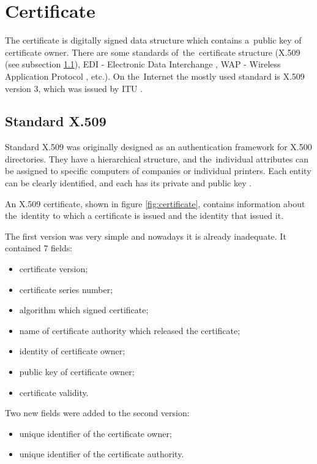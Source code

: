 \documentclass[
  12pt, 
  digital, %
  notable,   %
  nolof,     %
  nolot,     %
]{fithesis3}
\begin{document}
\section{Certificate}
The certificate is digitally signed data structure which contains a~public key of certificate 
owner. There are some standards of~the~certificate structure (X.509 (see subsection \ref{x509}), EDI - Electronic Data Interchange \cite{edi}, WAP - Wireless Application Protocol \cite{sharma2003wireless}, etc.). On the~Internet the mostly used standard is X.509 version 3, 
which was issued by ITU \cite{dostalek2016velky}. %

\subsection{Standard X.509}\label{x509}
Standard X.509 was originally designed as an authentication framework for X.500 directories. They 
have a hierarchical structure, and the~individual attributes can be assigned to specific computers 
of companies or individual printers. Each entity can be clearly identified, and each has its 
private and public key \cite{schmeh2006cryptography}. 

An X.509 certificate, shown in figure \ref{fig:certificate}, contains information about the~identity to which a certificate is issued and the identity that issued it. 

The first version was very simple and nowadays it is already inadequate. It contained 7 fields:
\begin{itemize}[leftmargin=2em,rightmargin=1em,itemsep=0.75\parskip,parsep=0em,topsep=0em,partopsep=0em]
\item certificate version;
\item certificate series number;
\item algorithm which signed certificate;
\item name of certificate authority which released the certificate;
\item identity of certificate owner;
\item public key of certificate owner;
\item certificate validity.
\end{itemize}
\vskip 0.1in

Two new fields were added to the second version:
\begin{itemize}[leftmargin=2em,rightmargin=1em,itemsep=0.75\parskip,parsep=0em,topsep=0em,partopsep=0em]
\item unique identifier of the certificate owner;
\item unique identifier of the certificate authority.
\end{itemize}
\vskip 0.1in
\end{document}
